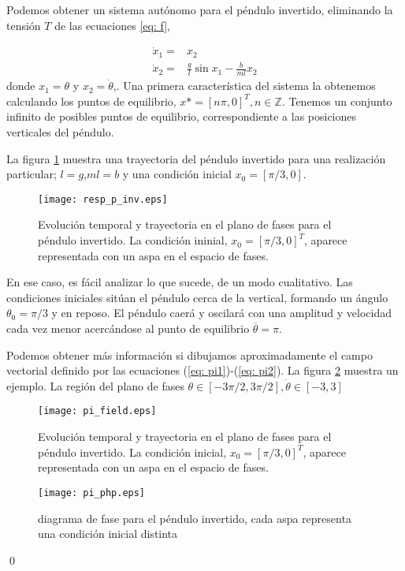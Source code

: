 \begin{example}
Podemos obtener un sistema autónomo para el péndulo invertido, eliminando la tensión $T$ de las ecuaciones \ref{eq: f},

\begin{align}
\dot x_1 = &x_2 \label{eq: pi1} \\ 
\dot x_2 = &\frac{g}{l}\sin x_1 - \frac{b}{ml}x_2 \label{eq: pi2}
\end{align}
donde $x_1 = \theta$ y $x_2 = \dot \theta$,. Una primera característica del sistema la obtenemos calculando los puntos de equilibrio, $x*=[n\pi,0]^T, n \in \mathbb{Z}$. Tenemos un conjunto infinito de posibles puntos de equilibrio, correspondiente a las posiciones verticales del péndulo.

La figura \ref{fig:trpen} muestra una trayectoria del péndulo invertido para una realización particular; $l=g$,$ml=b$ y una condición inicial $x_0=[\pi/3,0]$. 

\begin{figure}
\texttt{[image: resp\_p\_inv.eps]}
\caption{Evolución temporal y trayectoria en el plano de fases para el péndulo invertido. La condición ininial, $x_0=[\pi/3,0]^T$, aparece representada con un aspa en el espacio de fases.} \label{fig:trpen}
\end{figure}

En ese caso, es fácil analizar lo que sucede, de un modo cualitativo. Las condiciones iniciales sitúan el péndulo cerca de la vertical, formando un ángulo $\theta_0 =\pi/3$ y en reposo. El péndulo caerá y oscilará con una amplitud y velocidad cada vez menor acercándose al punto de equilibrio $\overline \theta = \pi$.

Podemos obtener más información si dibujamos aproximadamente el campo vectorial definido por las ecuaciones (\ref{eq: pi1})-(\ref{eq: pi2}). La figura \ref{fig:pifield} muestra un ejemplo. La región del plano de fases $\theta \in [-3\pi/2,3\pi/2], \dot \theta \in [-3,3]$
 
\begin{figure}
\centering
\texttt{[image: pi\_field.eps]}
\caption{Evolución temporal y trayectoria en el plano de fases para el péndulo invertido. La condición inicial, $x_0=[\pi/3,0]^T$, aparece representada con un aspa en el espacio de fases.} \label{fig:pifield}
\end{figure}

 \begin{figure}
\centering
\texttt{[image: pi\_php.eps]}
\caption{diagrama de fase para el péndulo invertido, cada aspa representa una condición inicial distinta} \label{fig:piphp}
\end{figure}
\qed
\end{example}



